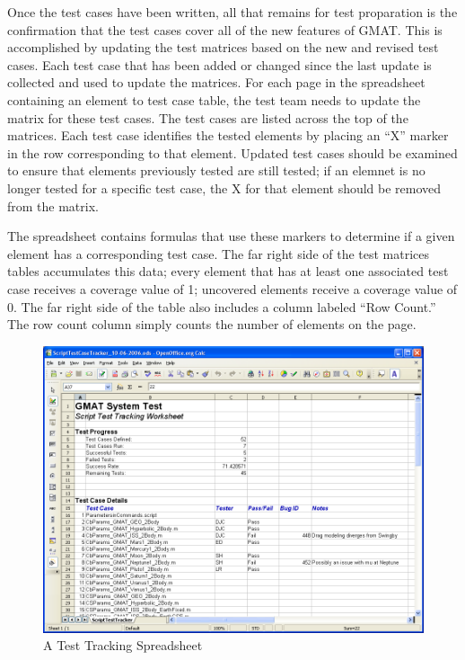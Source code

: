 Once the test cases have been written, all that remains for test proparation is the confirmation
that the test cases cover all of the new features of GMAT.  This is accomplished by updating the
test matrices based on the new and revised test cases.  Each test case that has been added or
changed since the last update is collected and used to update the matrices.  For each page in the
spreadsheet containing an element to test case table, the test team needs to update the matrix
for these test cases.  The test cases are listed across the top of the matrices.  Each test case
identifies the tested elements by placing an ``X'' marker in the row corresponding to that element.
 Updated test cases should be examined to ensure that elements previously tested are still tested;
if an elemnet is no longer tested for a specific test case, the X for that element should be
removed from the matrix.

The spreadsheet contains formulas that use these markers to determine if a given element has a
corresponding test case.  The far right side of the test matrices tables accumulates this data;
every element that has at least one associated test case receives a coverage value of 1; uncovered
elements receive a coverage value of 0.  The far right side of the table also includes a column
labeled ``Row Count.'' The row count column simply counts the number of elements on the page.

\begin{figure}[htb]
\begin{center}
\includegraphics[460,346]{Images/TestTrackingWorksheet.png}
\caption{\label{figure:ScriptTestTracker}A Test Tracking Spreadsheet}
\end{center}
\end{figure}

